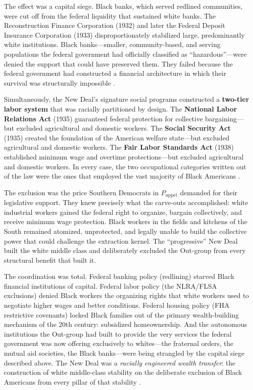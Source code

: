 The effect was a capital siege. Black banks, which served redlined communities, were cut off from the federal liquidity that sustained white banks. The Reconstruction Finance Corporation (1932) and later the Federal Deposit Insurance Corporation (1933) disproportionately stabilized large, predominantly white institutions. Black banks---smaller, community-based, and serving populations the federal government had officially classified as ``hazardous''---were denied the support that could have preserved them. They failed because the federal government had constructed a financial architecture in which their survival was structurally impossible \cite{baradaran_color}.

Simultaneously, the New Deal's signature social programs constructed a \textbf{two-tier labor system} that was racially partitioned by design. The \textbf{National Labor Relations Act} (1935) guaranteed federal protection for collective bargaining---but excluded agricultural and domestic workers. The \textbf{Social Security Act} (1935) created the foundation of the American welfare state---but excluded agricultural and domestic workers. The \textbf{Fair Labor Standards Act} (1938) established minimum wage and overtime protections---but excluded agricultural and domestic workers. In every case, the two occupational categories written out of the law were the ones that employed the vast majority of Black Americans \cite{katznelson_fear}.

The exclusion was the price Southern Democrats in $P_{\text{uppet}}$ demanded for their legislative support. They knew precisely what the carve-outs accomplished: white industrial workers gained the federal right to organize, bargain collectively, and receive minimum wage protection. Black workers in the fields and kitchens of the South remained atomized, unprotected, and legally unable to build the collective power that could challenge the extraction kernel. The ``progressive'' New Deal built the white middle class and deliberately excluded the Out-group from every structural benefit that built it.

The coordination was total. Federal banking policy (redlining) starved Black financial institutions of capital. Federal labor policy (the NLRA/FLSA exclusions) denied Black workers the organizing rights that white workers used to negotiate higher wages and better conditions. Federal housing policy (FHA restrictive covenants) locked Black families out of the primary wealth-building mechanism of the 20th century: subsidized homeownership. And the autonomous institutions the Out-group had built to provide the very services the federal government was now offering exclusively to whites---the fraternal orders, the mutual aid societies, the Black banks---were being strangled by the capital siege described above. The New Deal was a \textit{racially engineered wealth transfer}: the construction of white middle-class stability on the deliberate exclusion of Black Americans from every pillar of that stability \cite{katznelson_fear}.

